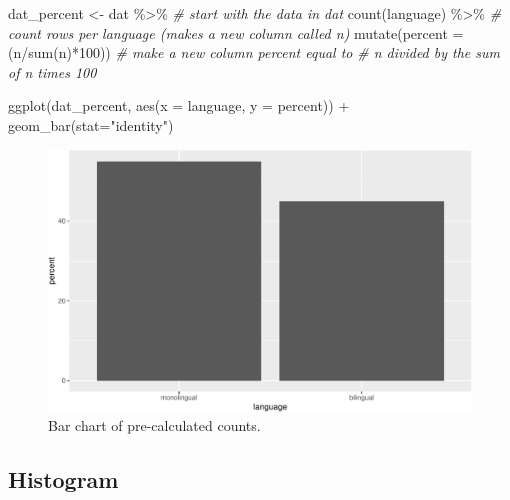 \documentclass[
  english,
  doc,floatsintext]{apa6}
\newenvironment{Shaded}{\begin{snugshade}}{\end{snugshade}}
\newcommand{\AttributeTok}[1]{\textcolor[rgb]{0.77,0.63,0.00}{#1}}
\newcommand{\CommentTok}[1]{\textcolor[rgb]{0.56,0.35,0.01}{\textit{#1}}}
\newcommand{\DecValTok}[1]{\textcolor[rgb]{0.00,0.00,0.81}{#1}}
\newcommand{\FunctionTok}[1]{\textcolor[rgb]{0.00,0.00,0.00}{#1}}
\newcommand{\NormalTok}[1]{#1}
\newcommand{\OtherTok}[1]{\textcolor[rgb]{0.56,0.35,0.01}{#1}}
\newcommand{\SpecialCharTok}[1]{\textcolor[rgb]{0.00,0.00,0.00}{#1}}
\newcommand{\StringTok}[1]{\textcolor[rgb]{0.31,0.60,0.02}{#1}}
\begin{document}
\begin{Shaded}
\begin{Highlighting}[]
\NormalTok{dat\_percent }\OtherTok{\textless{}{-}}\NormalTok{ dat }\SpecialCharTok{\%\textgreater{}\%}    \CommentTok{\# start with the data in dat}
  \FunctionTok{count}\NormalTok{(language) }\SpecialCharTok{\%\textgreater{}\%}     \CommentTok{\# count rows per language (makes a new column called n)}
  \FunctionTok{mutate}\NormalTok{(}\AttributeTok{percent =}\NormalTok{ (n}\SpecialCharTok{/}\FunctionTok{sum}\NormalTok{(n)}\SpecialCharTok{*}\DecValTok{100}\NormalTok{)) }\CommentTok{\# make a new column \textquotesingle{}percent\textquotesingle{} equal to }
                                   \CommentTok{\# n divided by the sum of n times 100}

\FunctionTok{ggplot}\NormalTok{(dat\_percent, }\FunctionTok{aes}\NormalTok{(}\AttributeTok{x =}\NormalTok{ language, }\AttributeTok{y =}\NormalTok{ percent)) }\SpecialCharTok{+}
  \FunctionTok{geom\_bar}\NormalTok{(}\AttributeTok{stat=}\StringTok{"identity"}\NormalTok{) }
\end{Highlighting}
\end{Shaded}

\begin{figure}

{\centering \includegraphics[width=1\linewidth]{images/bar-precalc-1} 

}

\caption{Bar chart of pre-calculated counts.}\label{fig:bar-precalc}
\end{figure}

\hypertarget{histogram}{%
\subsection{Histogram}\label{histogram}}
\end{document}
